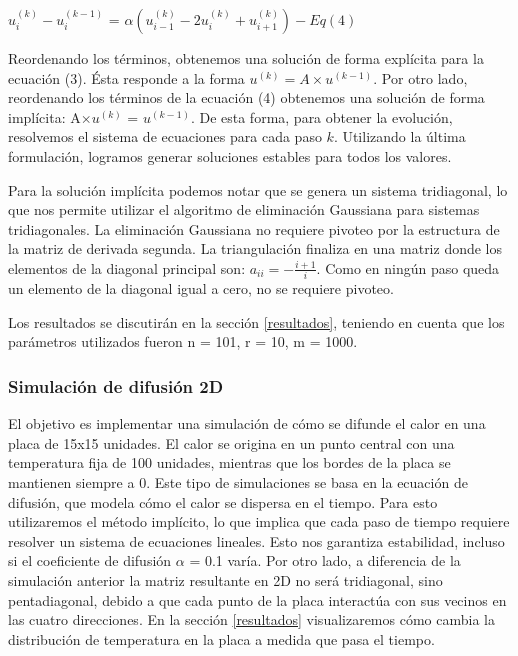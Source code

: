 \begin{center}
  $u_i^{(k)} - u_i^{(k-1)}$ = $\alpha(u_{i-1}^{(k)} - 2u_i^{(k)} + u_{i+1}^{(k)}) - Eq (4)$
\end{center}

Reordenando los términos, obtenemos una solución de forma explícita para la ecuación (3). Ésta responde a la forma $u^{(k)} = A \times u^{(k-1)}$. Por otro lado, reordenando los términos de la ecuación (4) obtenemos una solución de forma implícita: A$\times u^{(k)}$ = $u^{(k-1)}$. De esta forma, para obtener la evolución, resolvemos el sistema de ecuaciones para cada paso $k$.
Utilizando la última formulación, logramos generar soluciones estables para todos los valores.

Para la solución implícita podemos notar que se genera un sistema tridiagonal, lo que nos permite utilizar el algoritmo de eliminación Gaussiana para sistemas tridiagonales. La eliminación Gaussiana no requiere pivoteo por la estructura de la matriz de derivada segunda. La triangulación finaliza en una matriz donde los elementos de la diagonal principal son: $a_{ii} = - \frac{i+1}{i}$. 
Como en ningún paso queda un elemento de la diagonal igual a cero, no se requiere pivoteo.\par
Los resultados se discutirán en la sección \ref{resultados}, teniendo en cuenta que los parámetros utilizados fueron n = 101, r = 10, m = 1000.


\subsubsection{Simulación de difusión 2D}
 El objetivo es implementar una simulación de cómo se difunde el calor en una placa de 15x15 unidades. El calor se origina en un punto central con una temperatura fija de 100 unidades, mientras que los bordes de la placa se mantienen siempre a 0. Este tipo de simulaciones se basa en la ecuación de difusión, que modela cómo el calor se dispersa en el tiempo.
 Para esto utilizaremos el método implícito, lo que implica que cada paso de tiempo requiere resolver un sistema de ecuaciones lineales. Esto nos garantiza estabilidad, incluso si el coeficiente de difusión $\alpha$ = 0.1 varía.
Por otro lado, a diferencia de la simulación anterior la matriz resultante en 2D no será tridiagonal, sino pentadiagonal, debido a que cada punto de la placa interactúa con sus vecinos en las cuatro direcciones.
En la sección \ref{resultados} visualizaremos cómo cambia la distribución de temperatura en la placa a medida que pasa el tiempo.

